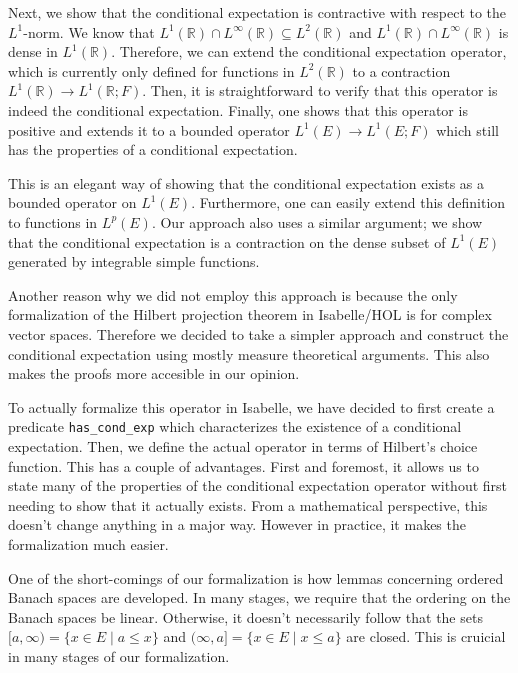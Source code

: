 Next, we show that the conditional expectation is contractive with respect to the $L^1$-norm. We know that $L^1(\mathbb{R}) \cap L^\infty(\mathbb{R}) \subseteq L^2(\mathbb{R})$ and $L^1(\mathbb{R}) \cap L^\infty(\mathbb{R})$ is dense in $L^1(\mathbb{R})$. Therefore, we can extend the conditional expectation operator, which is currently only defined for functions in $L^2(\mathbb{R})$ to a contraction $L^1(\mathbb{R}) \rightarrow L^1(\mathbb{R}; F)$. Then, it is straightforward to verify that this operator is indeed the conditional expectation. Finally, one shows that this operator is positive and extends it to a bounded operator $L^1(E)\rightarrow L^1(E; F)$ which still has the properties of a conditional expectation.

This is an elegant way of showing that the conditional expectation exists as a bounded operator on $L^1(E)$. Furthermore, one can easily extend this definition to functions in $L^p(E)$. Our approach also uses a similar argument; we show that the conditional expectation is a contraction on the dense subset of $L^1(E)$ generated by integrable simple functions.

Another reason why we did not employ this approach is because the only formalization of the Hilbert projection theorem in Isabelle/HOL is for complex vector spaces. Therefore we decided to take a simpler approach and construct the conditional expectation using mostly measure theoretical arguments. This also makes the proofs more accesible in our opinion.

To actually formalize this operator in Isabelle, we have decided to first create a predicate \texttt{has\_cond\_exp} which characterizes the existence of a conditional expectation. Then, we define the actual operator in terms of Hilbert's choice function. This has a couple of advantages. First and foremost, it allows us to state many of the properties of the conditional expectation operator without first needing to show that it actually exists. From a mathematical perspective, this doesn't change anything in a major way. However in practice, it makes the formalization much easier.

One of the short-comings of our formalization is how lemmas concerning ordered Banach spaces are developed. In many stages, we require that the ordering on the Banach spaces be linear. Otherwise, it doesn't necessarily follow that the sets $[a,\infty) = \{x \in E\;\vert\; a \le x\}$ and $(\infty, a] = \{x \in E\;\vert\; x \le a\}$ are closed. This is cruicial in many stages of our formalization. 

